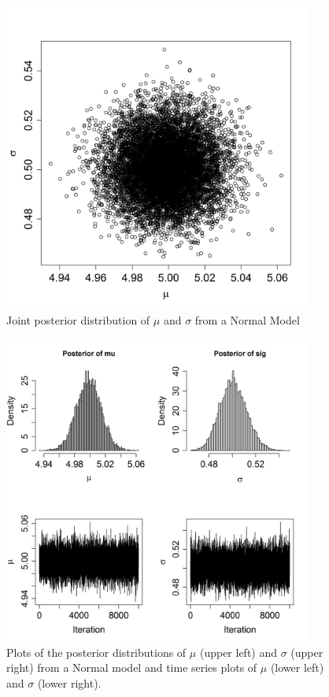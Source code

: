 \begin{figure}[ht]
\begin{center}
\includegraphics[height=4in]{Ch17-MCMC/figs/postdist}
\end{center}
\caption{Joint posterior distribution of $\mu$ and $\sigma$ from a Normal Model}
\label{postdist.fig}
\end{figure}

\begin{figure}[ht]
\begin{center}
\includegraphics[width=4in]{Ch17-MCMC/figs/plotsofPD}
\end{center}
\caption{
Plots of the posterior distributions of $\mu$ (upper left) and
  $\sigma$ (upper right)
  from a Normal model and time series plots of $\mu$ (lower left) and $\sigma$ (lower right).}
\label{plotsofPD.fig}
\end{figure}


